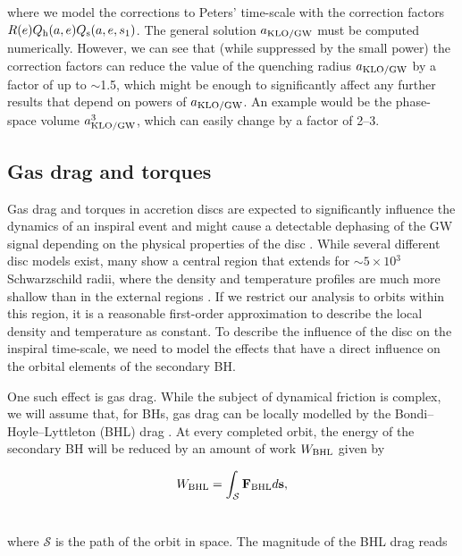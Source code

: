 \documentclass[usenatbib]{mnras}
\begin{document}
\noindent where we model the corrections to Peters' time-scale with the correction factors $R(e) Q_{\rm{h}}(a,e)Q_{\rm{s}}(a,e,s_1)$. The general solution $a_{\rm{KLO/GW}}$ must be computed numerically. However, we can see that (while suppressed by the small power) the correction factors can reduce the value of the quenching radius $a_{\rm{KLO/GW}}$ by a factor of up to $\sim$1.5, which might be enough to significantly affect any further results that depend on powers of $a_{\rm{KLO/GW}}$. An example would be the phase-space volume $a_{\rm{KLO/GW}}^3$, which can easily change by a factor of 2--3.

\subsection{Gas drag and torques}

Gas drag and torques in accretion discs are expected to significantly influence the dynamics of an inspiral event and might cause a detectable dephasing of the GW signal depending on the physical properties of the disc \citep[see, e.g.][]{2014PhRvD..89j4059B, 2019MNRAS.486.2754D}. While several different disc models exist, many show a central region that extends for $\sim$$5\times 10$$^3$ Schwarzschild radii, where the density and temperature profiles are much more shallow than in the external regions \citep[see the profiles in, e.g.][]{1973A&A....24..337S,2003MNRAS.341..501S,2009ASPC..408..128T}. If we restrict our analysis to orbits within this region, it is a reasonable first-order approximation to describe the local density and temperature as constant. To describe the influence of the disc on the inspiral time-scale, we need to model the effects that have a direct influence on the orbital elements of the secondary BH.

One such effect is gas drag. While the subject of dynamical friction is complex, we will assume that, for BHs, gas drag can be locally modelled by the Bondi--Hoyle--Lyttleton (BHL) drag \citep[see, e.g.][]{1939PCPS...35..592H,1944MNRAS.104..273B,1952MNRAS.112..195B,1999ApJ...513..252O,2020MNRAS.tmp.2858F}. At every completed orbit, the energy of the secondary BH will be reduced by an amount of work $W_{\rm{BHL}}$ given by

\begin{align}
    W_{\rm{BHL}}&= \int_{\mathcal{S}} \mathbf{F_{\rm{BHL}}} d\mathbf{s},\\ \nonumber
\end{align}

\noindent where $\mathcal{S}$ is the path of the orbit in space. The magnitude of the BHL drag reads
\end{document}
